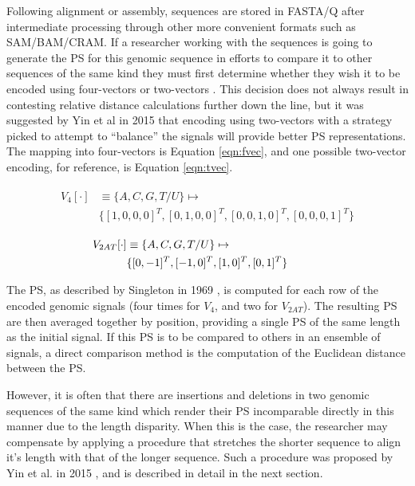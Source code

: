 \documentclass[10pt,conference]{IEEEtran}
\begin{document}
Following alignment or assembly, sequences are stored in FASTA/Q after intermediate processing through other more convenient formats such as SAM/BAM/CRAM. 
If a researcher working with the sequences is going to generate the PS for this genomic sequence in efforts to compare it to other sequences of the same kind they must first determine whether they wish it to be encoded using four-vectors or two-vectors \cite{Vos92}.
This decision does not always result in contesting relative distance calculations further down the line, but it was suggested by Yin et al in 2015 \cite{yin15} 
that encoding using two-vectors with a strategy picked to attempt to ``balance'' the signals will provide better PS representations.  
The mapping into four-vectors is Equation \ref{eqn:fvec}, and one possible two-vector encoding, for reference, is Equation \ref{eqn:tvec}. 

\noindent 
\begin{align}
\begin{split}
\label{eqn:fvec}
V_4[\cdot] &\equiv \{A,C,G,T/U\} \mapsto \\
& \{ [1,0,0,0]^T,[0,1,0,0]^T,[0,0,1,0]^T,[0,0,0,1]^T\}
\end{split}
\end{align}


\noindent 
\begin{align}
\begin{split}
\hspace{-8 em}
\label{eqn:tvec}
V_{2AT}[\cdot] &\equiv\{A,C,G,T/U\} \mapsto \\
& \{ [0,-1]^T,[-1,0]^T,[1,0]^T,[0,1]^T\}
\end{split}
\end{align}


The PS, as described by Singleton in 1969 \cite{Sin69}, is computed for each row of the encoded genomic signals (four times for $V_4$, and two for $V_{2AT}$).
The resulting PS are then averaged together by position, providing a single PS of the same length as the initial signal. 
If this PS is to be compared to others in an ensemble of signals, a direct comparison method is the 
computation of the Euclidean distance between the PS. 

However, it is often that there are insertions and deletions in two genomic sequences of the same kind 
which render their PS incomparable directly in this manner due to the length disparity. 
When this is the case, the researcher may compensate by applying a procedure that stretches the 
shorter sequence to align it's length with that of the longer sequence. 
Such a procedure was proposed by Yin et al. in 2015 \cite{yin15}, and is described in detail in the next section. 
\end{document}
